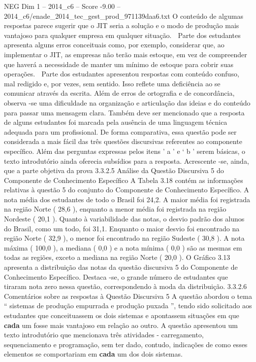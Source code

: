 \begin{textsample}{NEG Dim 1 – 2014\_c6 – Score -9.00 – 2014\_c6/enade\_2014\_tec\_gest\_prod\_971139daa6.txt}
O conteúdo de algumas respostas parece sugerir que o JIT seria a solução e o modo de produção mais vantajoso para qualquer empresa em qualquer situação.  Parte dos estudantes apresenta alguns erros conceituais como, por exemplo, considerar que, ao implementar o JIT, as empresas não terão mais estoque, em vez de compreender que haverá a necessidade de manter um mínimo de estoque para cobrir suas operações.  Parte dos estudantes apresentou respostas com conteúdo confuso, mal redigido e, por vezes, sem sentido.
Isso reflete uma deficiência ao se comunicar através da escrita.
Além de erros de ortografia e de concordância, observa -se uma dificuldade na organização e articulação das ideias e do conteúdo para passar uma mensagem clara.
Também deve ser mencionado que a resposta de alguns estudantes foi marcada pela ausência de uma linguagem técnica adequada para um profissional.
De forma comparativa, essa questão pode ser considerada a mais fácil das três questões discursivas referentes ao componente específico.
Além das perguntas expressas pelos itens ’ a ’ e ‘ b ’ serem básicas, o texto introdutório ainda oferecia subsídios para a resposta.
Acrescente -se, ainda, que a parte objetiva da prova 3.3.2.5 Análise da Questão Discursiva 5 do Componente de Conhecimento Específico A Tabela 3.18 contém as informações relativas à questão 5 do conjunto do Componente de Conhecimento Específico.
A nota média dos estudantes de todo o Brasil foi 24,2.
A maior média foi registrada na região Norte ( 28,6 ), enquanto a menor média foi registrada na região Nordeste ( 20,1 ).
Quanto à variabilidade das notas, o desvio padrão dos alunos do Brasil, como um todo, foi 31,1.
Enquanto o maior desvio foi encontrado na região Norte ( 32,9 ), o menor foi encontrado na região Sudeste ( 30,8 ).
A nota máxima ( 100,0 ), a mediana ( 0,0 ) e a nota mínima ( 0,0 ) são as mesmas em todas as regiões, exceto a mediana na região Norte ( 20,0 ).
O Gráfico 3.13 apresenta a distribuição das notas da questão discursiva 5 do Componente de Conhecimento Específico.
Destaca -se, o grande número de estudantes que tiraram nota zero nessa questão, correspondendo à moda da distribuição. 3.3.2.6 Comentários sobre as respostas à Questão Discursiva 5 A questão abordou o tema “ sistemas de produção empurrada e produção puxada ”, tendo sido solicitado aos estudantes que conceituassem os dois sistemas e apontassem situações em que \textbf{cada} um fosse mais vantajoso em relação ao outro.
A questão apresentou um texto introdutório que mencionava três atividades - carregamento, sequenciamento e programação, sem ter dado, contudo, indicações de como esses elementos se comportariam em \textbf{cada} um dos dois sistemas.

\end{textsample}
